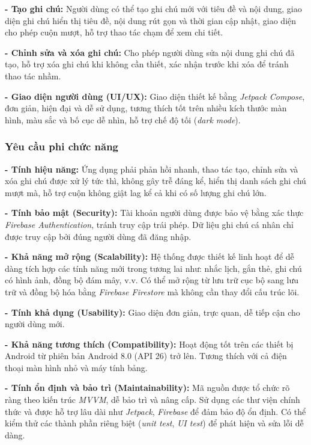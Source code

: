 \documentclass[a4paper,12pt]{article}
\begin{document}
\textbf{- Tạo ghi chú:} Người dùng có thể tạo ghi chú mới với tiêu đề và nội dung, giao diện ghi chú hiển thị tiêu đề, nội dung rút gọn và thời gian cập nhật, giao diện cho phép cuộn mượt, hỗ trợ thao tác chạm để xem chi tiết.

\textbf{- Chỉnh sửa và xóa ghi chú:} Cho phép người dùng sửa nội dung ghi chú đã tạo, hỗ trợ xóa ghi chú khi không cần thiết, xác nhận trước khi xóa để tránh thao tác nhầm.

\textbf{- Giao diện người dùng (UI/UX):} Giao diện thiết kế bằng \textit{Jetpack Compose}, đơn giản, hiện đại và dễ sử dụng, tương thích tốt trên nhiều kích thước màn hình, màu sắc và bố cục dễ nhìn, hỗ trợ chế độ tối (\textit{dark mode}).

\subsubsection{Yêu cầu phi chức năng}
\textbf{- Tính hiệu năng:} Ứng dụng phải phản hồi nhanh, thao tác tạo, chỉnh sửa và xóa ghi chú được xử lý tức thì, không gây trễ đáng kể, hiển thị danh sách ghi chú mượt mà, hỗ trợ cuộn không giật lag kể cả khi có số lượng ghi chú lớn.

\textbf{- Tính bảo mật (Security):} Tài khoản người dùng được bảo vệ bằng xác thực \textit{Firebase Authentication}, tránh truy cập trái phép. Dữ liệu ghi chú cá nhân chỉ được truy cập bởi đúng người dùng đã đăng nhập.

\textbf{- Khả năng mở rộng (Scalability):} Hệ thống được thiết kế linh hoạt để dễ dàng tích hợp các tính năng mới trong tương lai như: nhắc lịch, gắn thẻ, ghi chú có hình ảnh, đồng bộ đám mây, v.v. Có thể mở rộng từ lưu trữ cục bộ sang lưu trữ và đồng bộ hóa bằng \textit{Firebase Firestore} mà không cần thay đổi cấu trúc lõi.

\textbf{- Tính khả dụng (Usability):} Giao diện đơn giản, trực quan, dễ tiếp cận cho người dùng mới.

\textbf{- Khả năng tương thích (Compatibility):} Hoạt động tốt trên các thiết bị Android từ phiên bản Android 8.0 (API 26) trở lên. Tương thích với cả điện thoại màn hình nhỏ và máy tính bảng.

\textbf{- Tính ổn định và bảo trì (Maintainability):} Mã nguồn được tổ chức rõ ràng theo kiến trúc \textit{MVVM}, dễ bảo trì và nâng cấp. Sử dụng các thư viện chính thức và được hỗ trợ lâu dài như \textit{Jetpack}, \textit{Firebase} để đảm bảo độ ổn định. Có thể kiểm thử các thành phần riêng biệt (\textit{unit test}, \textit{UI test}) để phát hiện và sửa lỗi dễ dàng.
\end{document}
